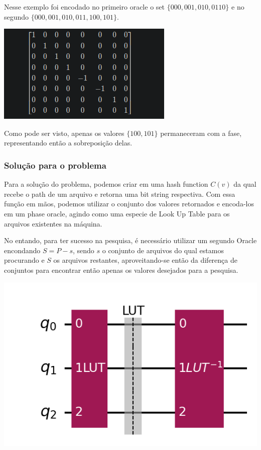 \documentclass{article}
\begin{document}
Nesse exemplo foi encodado no primeiro oracle o set $\{000, 001, 010, 0110\}$ e no segundo $\{000, 001, 010, 011, 100, 101\}$.

\begin{center}
	\includegraphics[scale=0.5]{less_than_unitary.png}
	\label{fig:less-than-circuit-unitary}
\end{center}

Como pode ser visto, apenas os valores $\{100, 101\}$ permaneceram com a fase, representando então a sobreposição delas.


\subsubsection{Solução para o problema}

Para a solução do problema, podemos criar em uma hash function $C(v)$ da qual recebe o path de um arquivo e retorna uma bit string respectiva. Com essa função em mãos, podemos utilizar o conjunto dos valores retornados e encoda-los em um phase oracle, agindo como uma especie de Look Up Table para os arquivos existentes na máquina.

No entando, para ter sucesso na pesquisa, é necessário utilizar um segundo Oracle encondando $S = P-s$, sendo $s$ o conjunto de arquivos do qual estamos procurando e $S$ os arquivos restantes, aproveitando-se então da diferença de conjuntos para encontrar então apenas os valores desejados para a pesquisa.


\begin{center}
	\includegraphics[scale=0.6]{sets-difference-look-up-table-oracle.png}
	\label{fig:luts}
\end{center}
\end{document}
